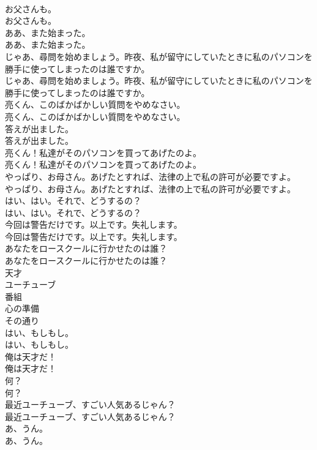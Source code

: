 \documentclass[8pt]{extreport}
\begin{document}
\begin{CJK}{UTF8}{min}
\\	お父さんも。	
\\	お父さんも。 
\\	ああ、また始まった。	
\\	ああ、また始まった。 
\\	じゃあ、尋問を始めましょう。昨夜、私が留守にしていたときに私のパソコンを勝手に使ってしまったのは誰ですか。	
\\	じゃあ、尋問を始めましょう。昨夜、私が留守にしていたときに私のパソコンを勝手に使ってしまったのは誰ですか。 
\\	亮くん、このばかばかしい質問をやめなさい。	
\\	亮くん、このばかばかしい質問をやめなさい。 
\\	答えが出ました。	
\\	答えが出ました。 
\\	亮くん！私達がそのパソコンを買ってあげたのよ。	
\\	亮くん！私達がそのパソコンを買ってあげたのよ。 
\\	やっぱり、お母さん。あげたとすれば、法律の上で私の許可が必要ですよ。	
\\	やっぱり、お母さん。あげたとすれば、法律の上で私の許可が必要ですよ。 
\\	はい、はい。それで、どうするの？	
\\	はい、はい。それで、どうするの？ 
\\	今回は警告だけです。以上です。失礼します。	
\\	今回は警告だけです。以上です。失礼します。 
\\	あなたをロースクールに行かせたのは誰？	
\\	あなたをロースクールに行かせたのは誰？ 
\\	天才
\\	ユーチューブ
\\	番組
\\	心の準備
\\	その通り
\\	はい、もしもし。	
\\	はい、もしもし。 
\\	俺は天才だ！	
\\	俺は天才だ！ 
\\	何？	
\\	何？ 
\\	最近ユーチューブ、すごい人気あるじゃん？	
\\	最近ユーチューブ、すごい人気あるじゃん？ 
\\	あ、うん。	
\\	あ、うん。 

\end{CJK}
\end{document}

